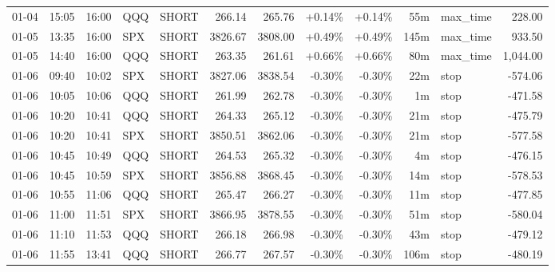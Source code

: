 \documentclass[11pt,a4paper,twoside]{article}
\begin{document}
\begin{center}
\begin{longtable}{>{\color{txtmain}}l l l l l r r r r r >{\color{txtmain}}l r}
01-04 & 15:05 & 16:00 & QQQ & SHORT & 266.14 & 265.76 & \textcolor{wingreen}{+0.14\%} & \textcolor{wingreen}{+0.14\%} & 55m & max\_time & \textcolor{wingreen}{228.00} \\
01-05 & 13:35 & 16:00 & SPX & SHORT & 3826.67 & 3808.00 & \textcolor{wingreen}{+0.49\%} & \textcolor{wingreen}{+0.49\%} & 145m & max\_time & \textcolor{wingreen}{933.50} \\
01-05 & 14:40 & 16:00 & QQQ & SHORT & 263.35 & 261.61 & \textcolor{wingreen}{+0.66\%} & \textcolor{wingreen}{+0.66\%} & 80m & max\_time & \textcolor{wingreen}{1,044.00} \\
01-06 & 09:40 & 10:02 & SPX & SHORT & 3827.06 & 3838.54 & \textcolor{lossred}{-0.30\%} & \textcolor{lossred}{-0.30\%} & 22m & stop & \textcolor{lossred}{-574.06} \\
01-06 & 10:05 & 10:06 & QQQ & SHORT & 261.99 & 262.78 & \textcolor{lossred}{-0.30\%} & \textcolor{lossred}{-0.30\%} & 1m & stop & \textcolor{lossred}{-471.58} \\
01-06 & 10:20 & 10:41 & QQQ & SHORT & 264.33 & 265.12 & \textcolor{lossred}{-0.30\%} & \textcolor{lossred}{-0.30\%} & 21m & stop & \textcolor{lossred}{-475.79} \\
01-06 & 10:20 & 10:41 & SPX & SHORT & 3850.51 & 3862.06 & \textcolor{lossred}{-0.30\%} & \textcolor{lossred}{-0.30\%} & 21m & stop & \textcolor{lossred}{-577.58} \\
01-06 & 10:45 & 10:49 & QQQ & SHORT & 264.53 & 265.32 & \textcolor{lossred}{-0.30\%} & \textcolor{lossred}{-0.30\%} & 4m & stop & \textcolor{lossred}{-476.15} \\
01-06 & 10:45 & 10:59 & SPX & SHORT & 3856.88 & 3868.45 & \textcolor{lossred}{-0.30\%} & \textcolor{lossred}{-0.30\%} & 14m & stop & \textcolor{lossred}{-578.53} \\
01-06 & 10:55 & 11:06 & QQQ & SHORT & 265.47 & 266.27 & \textcolor{lossred}{-0.30\%} & \textcolor{lossred}{-0.30\%} & 11m & stop & \textcolor{lossred}{-477.85} \\
01-06 & 11:00 & 11:51 & SPX & SHORT & 3866.95 & 3878.55 & \textcolor{lossred}{-0.30\%} & \textcolor{lossred}{-0.30\%} & 51m & stop & \textcolor{lossred}{-580.04} \\
01-06 & 11:10 & 11:53 & QQQ & SHORT & 266.18 & 266.98 & \textcolor{lossred}{-0.30\%} & \textcolor{lossred}{-0.30\%} & 43m & stop & \textcolor{lossred}{-479.12} \\
01-06 & 11:55 & 13:41 & QQQ & SHORT & 266.77 & 267.57 & \textcolor{lossred}{-0.30\%} & \textcolor{lossred}{-0.30\%} & 106m & stop & \textcolor{lossred}{-480.19} \\

\end{longtable}
\end{center}
\end{document}
